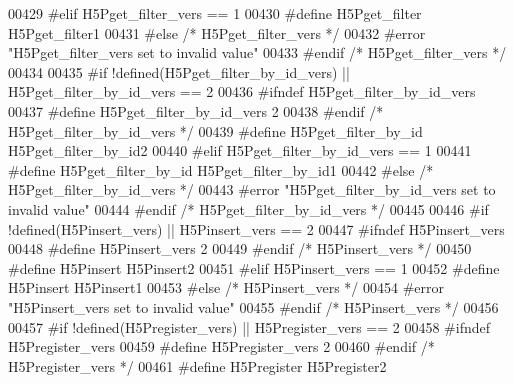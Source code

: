 \begin{DoxyCode}
00429 \textcolor{preprocessor}{#elif H5Pget\_filter\_vers == 1}
00430 \textcolor{preprocessor}{  #define H5Pget\_filter H5Pget\_filter1}
00431 \textcolor{preprocessor}{#else }\textcolor{comment}{/* H5Pget\_filter\_vers */}\textcolor{preprocessor}{}
00432 \textcolor{preprocessor}{  #error "H5Pget\_filter\_vers set to invalid value"}
00433 \textcolor{preprocessor}{#endif }\textcolor{comment}{/* H5Pget\_filter\_vers */}\textcolor{preprocessor}{}
00434 
00435 \textcolor{preprocessor}{#if !defined(H5Pget\_filter\_by\_id\_vers) || H5Pget\_filter\_by\_id\_vers == 2}
00436 \textcolor{preprocessor}{  #ifndef H5Pget\_filter\_by\_id\_vers}
00437 \textcolor{preprocessor}{    #define H5Pget\_filter\_by\_id\_vers 2}
00438 \textcolor{preprocessor}{  #endif }\textcolor{comment}{/* H5Pget\_filter\_by\_id\_vers */}\textcolor{preprocessor}{}
00439 \textcolor{preprocessor}{  #define H5Pget\_filter\_by\_id H5Pget\_filter\_by\_id2}
00440 \textcolor{preprocessor}{#elif H5Pget\_filter\_by\_id\_vers == 1}
00441 \textcolor{preprocessor}{  #define H5Pget\_filter\_by\_id H5Pget\_filter\_by\_id1}
00442 \textcolor{preprocessor}{#else }\textcolor{comment}{/* H5Pget\_filter\_by\_id\_vers */}\textcolor{preprocessor}{}
00443 \textcolor{preprocessor}{  #error "H5Pget\_filter\_by\_id\_vers set to invalid value"}
00444 \textcolor{preprocessor}{#endif }\textcolor{comment}{/* H5Pget\_filter\_by\_id\_vers */}\textcolor{preprocessor}{}
00445 
00446 \textcolor{preprocessor}{#if !defined(H5Pinsert\_vers) || H5Pinsert\_vers == 2}
00447 \textcolor{preprocessor}{  #ifndef H5Pinsert\_vers}
00448 \textcolor{preprocessor}{    #define H5Pinsert\_vers 2}
00449 \textcolor{preprocessor}{  #endif }\textcolor{comment}{/* H5Pinsert\_vers */}\textcolor{preprocessor}{}
00450 \textcolor{preprocessor}{  #define H5Pinsert H5Pinsert2}
00451 \textcolor{preprocessor}{#elif H5Pinsert\_vers == 1}
00452 \textcolor{preprocessor}{  #define H5Pinsert H5Pinsert1}
00453 \textcolor{preprocessor}{#else }\textcolor{comment}{/* H5Pinsert\_vers */}\textcolor{preprocessor}{}
00454 \textcolor{preprocessor}{  #error "H5Pinsert\_vers set to invalid value"}
00455 \textcolor{preprocessor}{#endif }\textcolor{comment}{/* H5Pinsert\_vers */}\textcolor{preprocessor}{}
00456 
00457 \textcolor{preprocessor}{#if !defined(H5Pregister\_vers) || H5Pregister\_vers == 2}
00458 \textcolor{preprocessor}{  #ifndef H5Pregister\_vers}
00459 \textcolor{preprocessor}{    #define H5Pregister\_vers 2}
00460 \textcolor{preprocessor}{  #endif }\textcolor{comment}{/* H5Pregister\_vers */}\textcolor{preprocessor}{}
00461 \textcolor{preprocessor}{  #define H5Pregister H5Pregister2}

\end{DoxyCode}
